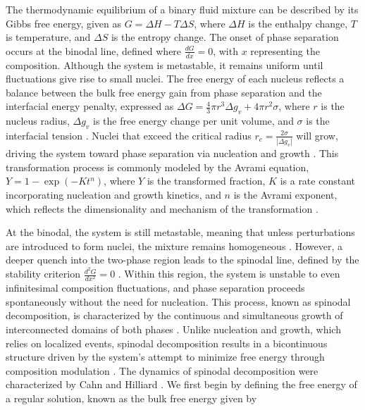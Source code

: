 The thermodynamic equilibrium of a binary fluid mixture can be described by its Gibbs free energy, given as $G = \Delta H - T \Delta S$, where \(\Delta H\) is the enthalpy change, 
\(T\) is temperature, and \(\Delta S\) is the entropy change. The onset of phase separation occurs at the binodal line, defined where \(\frac{dG}{dx} = 0\), with \(x\) representing the composition. 
Although the system is metastable, it remains uniform until fluctuations give rise to small nuclei. The free energy of each nucleus reflects a 
balance between the bulk free energy gain from phase separation and the interfacial energy penalty, expressed as \(\Delta G = \frac{4}{3}\pi r^3 \Delta g_v + 4 \pi r^2 \sigma\), where \(r\) is 
the nucleus radius, \(\Delta g_v\) is the free energy change per unit volume, and \(\sigma\) is the interfacial tension \cite{thanh_mechanisms_2014}. 
Nuclei that exceed the critical radius \(r_c = \frac{2\sigma}{|\Delta g_v|}\) will grow, driving the system toward phase separation via nucleation and growth \cite{thanh_mechanisms_2014}. 
This transformation process is commonly modeled by the Avrami equation, \(Y = 1 - \exp(-K t^n)\), where \(Y\) is the 
transformed fraction, \(K\) is a rate constant incorporating nucleation and growth kinetics, and \(n\) is the Avrami exponent, which reflects the dimensionality and mechanism of the transformation
\cite{avrami_kinetics_1939}.

At the binodal, the system is still metastable, meaning that unless perturbations are introduced to form nuclei, the mixture remains homogeneous \cite{thanh_mechanisms_2014}.
However, a deeper quench into the two-phase region leads to the spinodal line, defined by the stability criterion \(\frac{d^2G}{dx^2} = 0\) \cite{cahn_free_1958}. 
Within this region, the system is unstable to even infinitesimal composition fluctuations, and phase 
separation proceeds spontaneously without the need for nucleation. This process, known as spinodal decomposition, is characterized by the continuous and simultaneous growth of interconnected 
domains of both phases \cite{cahn_free_1958}. Unlike nucleation and growth, which relies on localized events, spinodal decomposition 
results in a bicontinuous structure driven by the system's attempt to minimize 
free energy through composition modulation \cite{cahn_free_1958}. The dynamics of spinodal decomposition were characterized by Cahn and Hilliard \cite{cahn_spinodal_1961}. 
We first begin by defining the free energy of a regular solution, known as the bulk free energy given by

